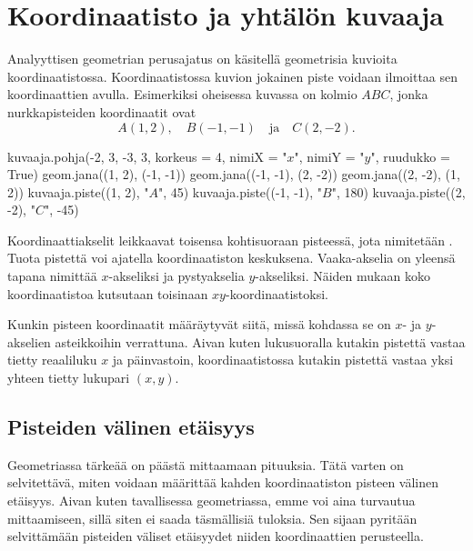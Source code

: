 \section{Koordinaatisto ja yhtälön kuvaaja}


Analyyttisen geometrian perusajatus on käsitellä geometrisia kuvioita koordinaatistossa.
Koordinaatistossa kuvion jokainen piste voidaan ilmoittaa sen koordinaattien avulla.
Esimerkiksi oheisessa kuvassa on kolmio $ABC$, jonka nurkkapisteiden koordinaatit ovat
\[
A(1, 2), \quad B(-1, -1) \quad \text{ja} \quad C(2, -2).
\]

\begin{kuva}
    kuvaaja.pohja(-2, 3, -3, 3, korkeus = 4, nimiX = "$x$", nimiY = "$y$", ruudukko = True)
    geom.jana((1, 2), (-1, -1))
    geom.jana((-1, -1), (2, -2))
    geom.jana((2, -2), (1, 2))
    kuvaaja.piste((1, 2), "$A$", 45)
    kuvaaja.piste((-1, -1), "$B$", 180)
    kuvaaja.piste((2, -2), "$C$", -45)
\end{kuva}

Koordinaattiakselit leikkaavat toisensa kohtisuoraan pisteessä, jota nimitetään .
Tuota pistettä voi ajatella koordinaatiston keskuksena.
Vaaka-akselia on yleensä tapana nimittää $x$-akseliksi ja pystyakselia $y$-akseliksi.
Näiden mukaan koko koordinaatistoa kutsutaan toisinaan $xy$-koordinaatistoksi.

Kunkin pisteen koordinaatit määräytyvät siitä, missä kohdassa se on $x$- ja $y$-akselien asteikkoihin verrattuna.
Aivan kuten lukusuoralla kutakin pistettä vastaa tietty reaaliluku $x$ ja päinvastoin, koordinaatistossa kutakin pistettä vastaa yksi yhteen tietty lukupari $(x, y)$.

\subsection{Pisteiden välinen etäisyys}

Geometriassa tärkeää on päästä mittaamaan pituuksia.
Tätä varten on selvitettävä, miten voidaan määrittää kahden koordinaatiston pisteen välinen etäisyys.
Aivan kuten tavallisessa geometriassa, emme voi aina turvautua mittaamiseen, sillä siten ei saada täsmällisiä tuloksia.
Sen sijaan pyritään selvittämään pisteiden väliset etäisyydet niiden koordinaattien perusteella.

